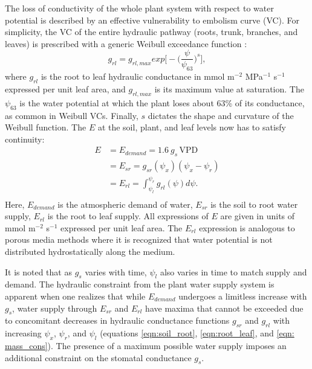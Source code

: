 \documentclass[utf8]{frontiersSCNS} %
\begin{document}
The loss of conductivity of the whole plant system with respect to water potential is described by an effective vulnerability to embolism curve (VC). For simplicity, the VC of the entire hydraulic pathway (roots, trunk, branches, and leaves) is prescribed with a generic Weibull exceedance function \citep{sperry_predicting_2017}:
\begin{equation}
    \label{eqn:root_leaf}
    g_{rl} = g_{rl,max}exp\Big[-\Big(\frac{\psi}{\psi_{63}}\Big)^s\Big],
\end{equation}
where $g_{rl}$ is the root to leaf hydraulic conductance in mmol m$^{-2}$ MPa$^{-1}$ s$^{-1}$ expressed per unit leaf area, and $g_{rl,max}$ is its maximum value at saturation. The $\psi_{63}$ is the water potential at which the plant loses about 63\% of its conductance, as common in Weibull VCs. Finally, $s$ dictates the shape and curvature of the Weibull function. 
The $E$ at the soil, plant, and leaf levels now has to satisfy continuity:
\begin{equation}
    \label{eqn: mass_cons}
        \begin{split}
        E & = E_{demand} = 1.6\: g_s\, \text{VPD} \\
        & = E_{sr} = g_{sr}(\psi_x)(\psi_x - \psi_r)\\
        & = E_{rl} = \int_{\psi_l}^{\psi_r} g_{rl}(\psi) d\psi. \\
        \end{split}
\end{equation}
Here, $E_{demand}$ is the atmospheric demand of water, $E_{sr}$ is the soil to root water supply, $E_{rl}$ is the root to leaf supply. All expressions of $E$ are given in units of mmol m$^{-2}$ s$^{-1}$ expressed per unit leaf area. The $E_{rl}$ expression is analogous to porous media methods where it is recognized that water potential is not distributed hydrostatically along the medium.

It is noted that as $g_s$ varies with time, $\psi_l$ also varies in time to match supply and demand. The hydraulic constraint from the plant water supply system is apparent when one realizes that while $E_{demand}$ undergoes a limitless increase with $g_s$, water supply through $E_{sr}$ and $E_{rl}$ have maxima that cannot be exceeded due to concomitant decreases in hydraulic conductance functions $g_{sr}$ and $g_{rl}$ with increasing $\psi_x$, $\psi_r$, and $\psi_l$ (equations \ref{eqn:soil_root}, \ref{eqn:root_leaf}, and \ref{eqn: mass_cons}). The presence of a maximum possible water supply imposes an additional constraint on the stomatal conductance $g_s$.  
\end{document}
